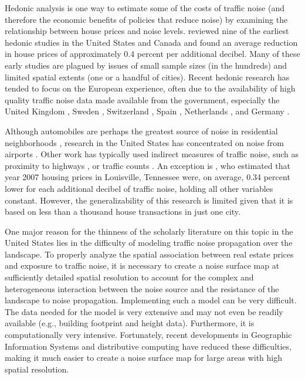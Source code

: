 \documentclass[leqno]{article}\usepackage[]{graphicx}\usepackage[]{color}
\begin{document}
Hedonic analysis is one way to estimate some of the costs of traffic noise (and therefore the economic benefits of policies that reduce noise) by examining the relationship between house prices and noise levels. \citet{Nelson1982} reviewed nine of the earliest hedonic studies in the United States and Canada and found an average reduction in house prices of approximately 0.4 percent per additional decibel. Many of these early studies \citep[such as][]{Gamble1974, Langley1976} are plagued by issues of small sample sizes (in the hundreds) and limited spatial extents (one or a handful of cities). Recent hedonic research has tended to focus on the European experience, often due to the availability of high quality traffic noise data made available from the government, especially the United Kingdom \citep{Day2007, Blanco2011}, Sweden \citep{Wilhelmsson2000, Andersson2010}, Switzerland \citep{Baranzini2010}, Spain \citep{MarmolejoDuarteCarlos;GonzalezTamez2009}, Netherlands \citep{Theebe2004a}, and Germany \citep{Brandt2011}. 


Although automobiles are perhaps the greatest source of noise in residential neighborhoods \citep{Barber2010}, research in the United States has concentrated on noise from airports \citep{Espey2000, McMillen2004, Cohen2008a}. Other work has typically used indirect measures of traffic noise, such as proximity to highways \citep{Matthews2007, Chernobai2009, Li2012}, or traffic counts \citep{HughesJr.1992, Larsen2012}. An exception is \citet{Cheng2008}, who estimated that year 2007 housing prices in Louisville, Tennessee were, on average, 0.34 percent lower for each additional decibel of traffic noise, holding all other variables constant. However, the generalizability of this research is limited given that it is based on less than a thousand house transactions in just one city. 

One major reason for the thinness of the scholarly literature on this topic in the United States lies in the difficulty of modeling traffic noise propagation over the landscape. To properly analyze the spatial association between real estate prices and exposure to traffic noise, it is necessary to create a noise surface map at sufficiently detailed spatial resolution to account for the complex and heterogeneous interaction between the noise source and the resistance of the landscape to noise propagation.  Implementing such a model can be very difficult.  The data needed for the model is very extensive and may not even be readily available (e.g., building footprint and height data).  Furthermore, it is computationally very intensive. Fortunately, recent developments in Geographic Information Systems and distributive computing have reduced these difficulties, making it much easier to create a noise surface map for large areas with high spatial resolution.  
\end{document}

